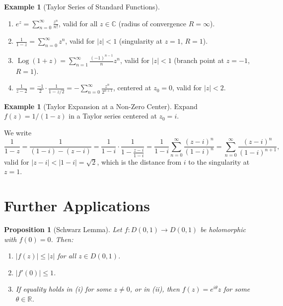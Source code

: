 \documentclass[12pt,a4paper,openany]{book}
\theoremstyle{definition}
\newtheorem{example}[definition]{Example}
\theoremstyle{plain}
\newtheorem{proposition}[definition]{Proposition}
\theoremstyle{remark}
\newcommand{\C}{\mathbb{C}}
\newcommand{\R}{\mathbb{R}}
\DeclareMathOperator{\Log}{Log}
\newcommand{\abs}[1]{\left|#1\right|}
\begin{document}
\begin{example}[Taylor Series of Standard Functions]\label{ex:taylor-standard}
\begin{enumerate}[label=(\alph*)]
\item $\displaystyle e^z = \sum_{n=0}^{\infty}\frac{z^n}{n!}$, valid for all $z\in\C$
  (radius of convergence $R=\infty$).
\item $\displaystyle\frac{1}{1-z}=\sum_{n=0}^{\infty}z^n$, valid for $\abs{z}<1$
  (singularity at $z=1$, $R=1$).
\item $\displaystyle\Log(1+z)=\sum_{n=1}^{\infty}\frac{(-1)^{n-1}}{n}z^n$, valid for $\abs{z}<1$
  (branch point at $z=-1$, $R=1$).
\item $\displaystyle\frac{1}{z-2}=\frac{-1}{2}\cdot\frac{1}{1-z/2}
  = -\sum_{n=0}^{\infty}\frac{z^n}{2^{n+1}}$, centered at $z_0=0$, valid for $\abs{z}<2$.
\end{enumerate}
\end{example}

\begin{example}[Taylor Expansion at a Non-Zero Center]\label{ex:taylor-nonzero-center}
Expand $f(z)=1/(1-z)$ in a Taylor series centered at $z_0=i$.

We write
\[
  \frac{1}{1-z} = \frac{1}{(1-i)-(z-i)}
  = \frac{1}{1-i}\cdot\frac{1}{1-\frac{z-i}{1-i}}
  = \frac{1}{1-i}\sum_{n=0}^{\infty}\frac{(z-i)^n}{(1-i)^n}
  = \sum_{n=0}^{\infty}\frac{(z-i)^n}{(1-i)^{n+1}},
\]
valid for $\abs{z-i}<\abs{1-i}=\sqrt{2}$, which is the distance from $i$ to the
singularity at $z=1$.
\end{example}

\section{Further Applications}
\label{sec:further-applications}

\begin{proposition}[Schwarz Lemma]\label{prop:schwarz}
Let $f\colon D(0,1)\to D(0,1)$ be holomorphic with $f(0)=0$. Then:
\begin{enumerate}[label=(\roman*)]
  \item $\abs{f(z)}\le\abs{z}$ for all $z\in D(0,1)$.
  \item $\abs{f'(0)}\le 1$.
  \item If equality holds in (i) for some $z\ne 0$, or in (ii), then $f(z)=e^{i\theta}z$
    for some $\theta\in\R$.
\end{enumerate}
\end{proposition}
\end{document}
